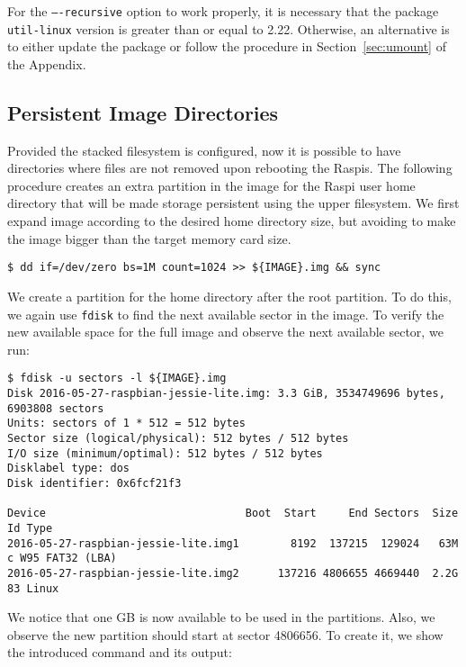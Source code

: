 For the \texttt{----recursive} option to work properly, it is necessary that
the package \texttt{util-linux} version is greater than or equal to 2.22.
Otherwise, an alternative is to either update the package or follow the
procedure in Section~\ref{sec:umount} of the Appendix.

\subsection{Persistent Image Directories}
\label{sec:persistent_directories}
Provided the stacked filesystem is configured, now it is possible to have
directories where files are not removed upon rebooting the \ac{Raspi}s.
The following procedure creates an extra partition in the image for
the \ac{Raspi} user home directory that will be made storage persistent
using the upper filesystem. We first expand image according to the desired
home directory size, but avoiding to make the image bigger than the target
memory card size.

\begin{lstlisting}[]
$ dd if=/dev/zero bs=1M count=1024 >> ${IMAGE}.img && sync
\end{lstlisting}
\FloatBarrier
\vspace{-5mm}

We create a partition for the home directory after the root partition.
To do this, we again use \texttt{fdisk} to find the next available sector
in the image. To verify the new available space for the full image and observe
the next available sector, we run:
\begin{lstlisting}[]
$ fdisk -u sectors -l ${IMAGE}.img
Disk 2016-05-27-raspbian-jessie-lite.img: 3.3 GiB, 3534749696 bytes, 6903808 sectors
Units: sectors of 1 * 512 = 512 bytes
Sector size (logical/physical): 512 bytes / 512 bytes
I/O size (minimum/optimal): 512 bytes / 512 bytes
Disklabel type: dos
Disk identifier: 0x6fcf21f3

Device                               Boot  Start     End Sectors  Size Id Type
2016-05-27-raspbian-jessie-lite.img1        8192  137215  129024   63M  c W95 FAT32 (LBA)
2016-05-27-raspbian-jessie-lite.img2      137216 4806655 4669440  2.2G 83 Linux
\end{lstlisting}
\FloatBarrier
\vspace{-5mm}

We notice that one GB is now available to be used in the partitions. Also, we
observe the new partition should start at sector 4806656. To create it, we
show the introduced command and its output:

